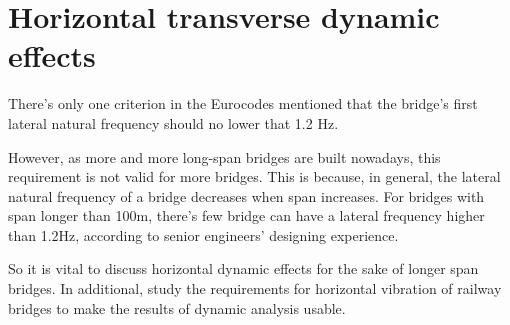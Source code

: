 \section{Horizontal transverse dynamic effects}
There's only one criterion in the Eurocodes mentioned that the bridge's first lateral natural frequency should no lower that 1.2 Hz. 

However, as more and more long-span bridges are built nowadays, this requirement is not valid for more bridges. This is because, in general, the lateral natural frequency of a bridge decreases when span increases. For bridges with span longer than 100m, there's few bridge can have a lateral frequency higher than 1.2Hz, according to senior engineers' designing experience.

So it is vital to discuss horizontal dynamic effects for the sake of longer span bridges. In additional, study the requirements for horizontal vibration of railway bridges to make the results of dynamic analysis usable.








